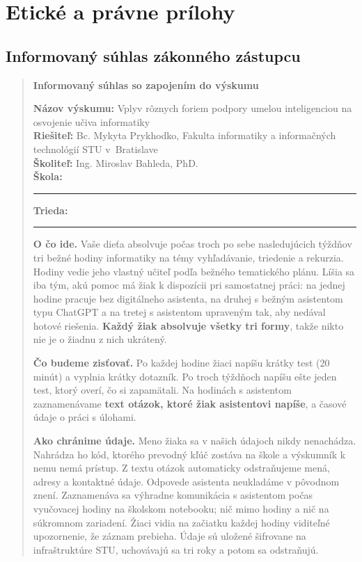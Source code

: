 \chapter{Etické a právne prílohy}
\label{chapter:etika}

\section{Informovaný súhlas zákonného zástupcu}

\begin{quote}\small
\textbf{Informovaný súhlas so zapojením do výskumu}

\textbf{Názov výskumu:} Vplyv rôznych foriem podpory umelou inteligenciou na osvojenie učiva informatiky\\
\textbf{Riešiteľ:} Bc. Mykyta Prykhodko, Fakulta informatiky a informačných technológií STU v~Bratislave\\
\textbf{Školiteľ:} Ing. Miroslav Bahleda, PhD.\\
\textbf{Škola:} \rule{4.5cm}{0.4pt} \quad \textbf{Trieda:} \rule{2cm}{0.4pt}

\textbf{O čo ide.} Vaše dieťa absolvuje počas troch po sebe nasledujúcich týždňov tri bežné hodiny informatiky na témy vyhľadávanie, triedenie a rekurzia. Hodiny vedie jeho vlastný učiteľ podľa bežného tematického plánu. Líšia sa iba tým, akú pomoc má žiak k dispozícii pri samostatnej práci: na jednej hodine pracuje bez digitálneho asistenta, na druhej s bežným asistentom typu ChatGPT a na tretej s asistentom upraveným tak, aby nedával hotové riešenia. \textbf{Každý žiak absolvuje všetky tri formy}, takže nikto nie je o žiadnu z nich ukrátený.

\textbf{Čo budeme zisťovať.} Po každej hodine žiaci napíšu krátky test (20 minút) a vyplnia krátky dotazník. Po troch týždňoch napíšu ešte jeden test, ktorý overí, čo si zapamätali. Na hodinách s asistentom zaznamenávame \textbf{text otázok, ktoré žiak asistentovi napíše}, a časové údaje o práci s úlohami.

\textbf{Ako chránime údaje.} Meno žiaka sa v našich údajoch nikdy nenachádza. Nahrádza ho kód, ktorého prevodný kľúč zostáva na škole a výskumník k nemu nemá prístup. Z textu otázok automaticky odstraňujeme mená, adresy a kontaktné údaje. Odpovede asistenta neukladáme v pôvodnom znení. Zaznamenáva sa výhradne komunikácia s asistentom počas vyučovacej hodiny na školskom notebooku; nič mimo hodiny a nič na súkromnom zariadení. Žiaci vidia na začiatku každej hodiny viditeľné upozornenie, že záznam prebieha. Údaje sú uložené šifrovane na infraštruktúre STU, uchovávajú sa tri roky a potom sa odstraňujú.


\end{quote}
